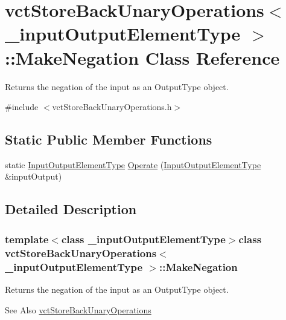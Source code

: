 \hypertarget{classvct_store_back_unary_operations_1_1_make_negation}{\section{vct\-Store\-Back\-Unary\-Operations$<$ \-\_\-input\-Output\-Element\-Type $>$\-:\-:Make\-Negation Class Reference}
\label{classvct_store_back_unary_operations_1_1_make_negation}
}


Returns the negation of the input as an Output\-Type object.  




{\ttfamily \#include $<$vct\-Store\-Back\-Unary\-Operations.\-h$>$}

\subsection*{Static Public Member Functions}
\begin{DoxyCompactItemize}
\item 
static \hyperlink{classvct_store_back_unary_operations_a8af17faaa73a8d090094d468eee32062}{Input\-Output\-Element\-Type} \hyperlink{classvct_store_back_unary_operations_1_1_make_negation_ad0167cb78e533cbf02fa7ccdc5986691}{Operate} (\hyperlink{classvct_store_back_unary_operations_a8af17faaa73a8d090094d468eee32062}{Input\-Output\-Element\-Type} \&input\-Output)
\end{DoxyCompactItemize}


\subsection{Detailed Description}
\subsubsection*{template$<$class \-\_\-input\-Output\-Element\-Type$>$class vct\-Store\-Back\-Unary\-Operations$<$ \-\_\-input\-Output\-Element\-Type $>$\-::\-Make\-Negation}

Returns the negation of the input as an Output\-Type object. 

\begin{DoxySeeAlso}{See Also}
\hyperlink{classvct_store_back_unary_operations}{vct\-Store\-Back\-Unary\-Operations} 
\end{DoxySeeAlso}


